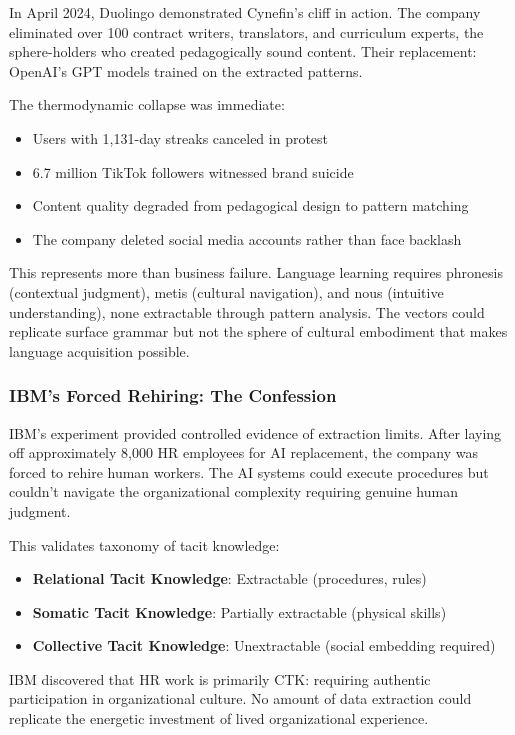 In April 2024, Duolingo demonstrated Cynefin's cliff in action. The company eliminated over 100 contract writers, translators, and curriculum experts, the sphere-holders who created pedagogically sound content. Their replacement: OpenAI's GPT models trained on the extracted patterns.

The thermodynamic collapse was immediate:
\begin{itemize}
\item Users with 1,131-day streaks canceled in protest
\item 6.7 million TikTok followers witnessed brand suicide
\item Content quality degraded from pedagogical design to pattern matching
\item The company deleted social media accounts rather than face backlash
\end{itemize}

This represents more than business failure. Language learning requires phronesis (contextual judgment), metis (cultural navigation), and nous (intuitive understanding), none extractable through pattern analysis. The vectors could replicate surface grammar but not the sphere of cultural embodiment that makes language acquisition possible.

\subsubsection{IBM's Forced Rehiring: The Confession}

IBM's experiment provided controlled evidence of extraction limits. After laying off approximately 8,000 HR employees for AI replacement, the company was forced to rehire human workers. The AI systems could execute procedures but couldn't navigate the organizational complexity requiring genuine human judgment.

This validates \citet{collins2010} taxonomy of tacit knowledge:
\begin{itemize}
\item \textbf{Relational Tacit Knowledge}: Extractable (procedures, rules)
\item \textbf{Somatic Tacit Knowledge}: Partially extractable (physical skills)
\item \textbf{Collective Tacit Knowledge}: Unextractable (social embedding required)
\end{itemize}

IBM discovered that HR work is primarily CTK: requiring authentic participation in organizational culture. No amount of data extraction could replicate the energetic investment of lived organizational experience.

